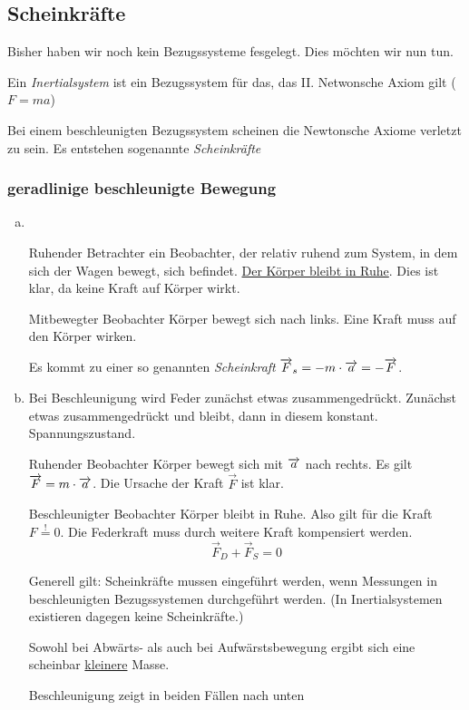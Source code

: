 \documentclass[a4paper,10pt]{scrartcl}
\begin{document}
\subsection{Scheinkräfte}
Bisher haben wir noch kein Bezugssysteme fesgelegt. Dies möchten wir nun tun.
\begin{df}[Inertialsystem]
 Ein \emph{Inertialsystem} ist ein Bezugssystem für das, das II. Netwonsche Axiom gilt ($F=ma$)
\end{df}
Bei einem beschleunigten Bezugssystem scheinen die Newtonsche Axiome verletzt zu sein. Es entstehen sogenannte \emph{Scheinkräfte}
\subsubsection{geradlinige beschleunigte Bewegung}
\begin{enumerate}[a)]
 \item {}\\
\begin{seg}{Ruhender Betrachter}
ein Beobachter, der relativ ruhend zum System, in dem sich der Wagen bewegt, sich befindet.
\underline{Der Körper bleibt in Ruhe}. Dies ist klar, da keine Kraft auf Körper wirkt.
\end{seg}
\begin{seg}{Mitbewegter Beobachter}
 Körper bewegt sich nach links. Eine Kraft muss auf den Körper wirken.
\end{seg}
Es kommt zu einer so genannten \emph{Scheinkraft} $\overrightarrow{F}_s=-m\cdot \overrightarrow{a}=-\overrightarrow{F}$.
\item {}
Bei Beschleunigung wird Feder zunächst etwas zusammengedrückt. Zunächst etwas zusammengedrückt und bleibt, dann in diesem konstant. Spannungszustand.
\begin{seg}{Ruhender Beobachter}
 Körper bewegt sich mit $\overrightarrow{a}$ nach rechts. Es gilt $\overrightarrow{F}=m\cdot \overrightarrow{a}$. Die Ursache der Kraft $\vec F$ ist klar.\\
\end{seg}
\begin{seg}{Beschleunigter Beobachter}
 Körper bleibt in Ruhe. Also gilt für die Kraft $F\stackrel{!}{=}0$. Die Federkraft muss durch weitere Kraft kompensiert werden.
\[
 \vec F_D+\vec F_S=0
\]
\end{seg}
Generell gilt: Scheinkräfte mussen eingeführt werden, wenn Messungen in beschleunigten Bezugssystemen durchgeführt werden.
(In Inertialsystemen existieren dagegen keine Scheinkräfte.)
\begin{ex*}
Sowohl bei Abwärts- als auch bei Aufwärstsbewegung ergibt sich eine scheinbar \underline{kleinere} Masse.
\end{ex*}
\begin{att*}
 Beschleunigung zeigt in beiden Fällen nach unten
\end{att*}

\end{enumerate}
\end{document}
